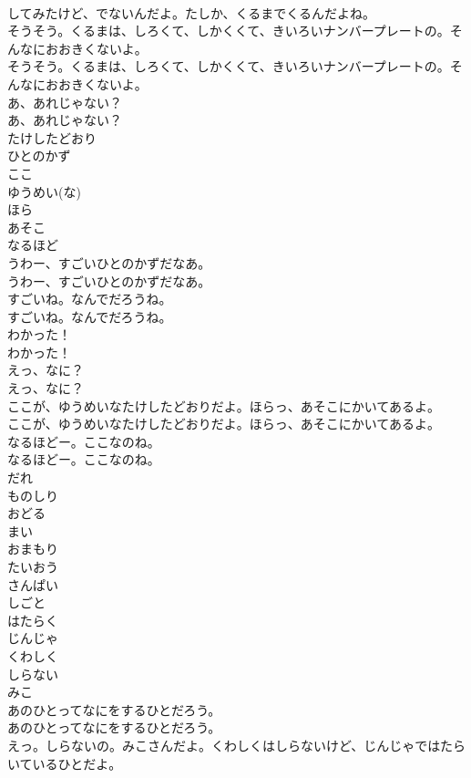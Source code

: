\documentclass[8pt]{extreport}
\begin{document}
\begin{CJK}{UTF8}{min}
\\	してみたけど、でないんだよ。たしか、くるまでくるんだよね。
\\	そうそう。くるまは、しろくて、しかくくて、きいろいナンバープレートの。そんなにおおきくないよ。
\\	そうそう。くるまは、しろくて、しかくくて、きいろいナンバープレートの。そんなにおおきくないよ。
\\	あ、あれじゃない？
\\	あ、あれじゃない？
\\	たけしたどおり
\\	ひとのかず
\\	ここ
\\	ゆうめい(な)
\\	ほら
\\	あそこ
\\	なるほど
\\	うわー、すごいひとのかずだなあ。
\\	うわー、すごいひとのかずだなあ。
\\	すごいね。なんでだろうね。
\\	すごいね。なんでだろうね。
\\	わかった！
\\	わかった！
\\	えっ、なに？
\\	えっ、なに？
\\	ここが、ゆうめいなたけしたどおりだよ。ほらっ、あそこにかいてあるよ。
\\	ここが、ゆうめいなたけしたどおりだよ。ほらっ、あそこにかいてあるよ。
\\	なるほどー。ここなのね。
\\	なるほどー。ここなのね。
\\	だれ
\\	ものしり
\\	おどる
\\	まい
\\	おまもり
\\	たいおう
\\	さんぱい
\\	しごと
\\	はたらく
\\	じんじゃ
\\	くわしく
\\	しらない
\\	みこ
\\	あのひとってなにをするひとだろう。
\\	あのひとってなにをするひとだろう。
\\	えっ。しらないの。みこさんだよ。くわしくはしらないけど、じんじゃではたらいているひとだよ。

\end{CJK}
\end{document}
